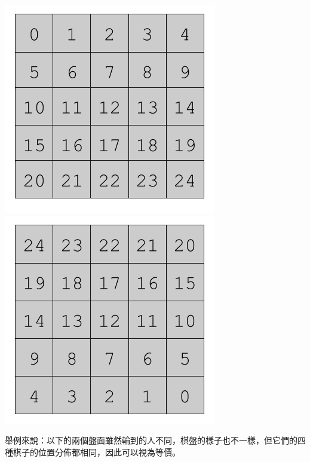 \documentclass[12pt,a4paper]{article}
\begin{document}
        \includegraphics[scale = 0.5]{img/RedNumber.png}\includegraphics[scale = 0.5]{img/BlueNumber.png}

        舉例來說：以下的兩個盤面雖然輪到的人不同，棋盤的樣子也不一樣，但它們的四種棋子的位置分佈都相同，因此可以視為等價。
\end{document}
